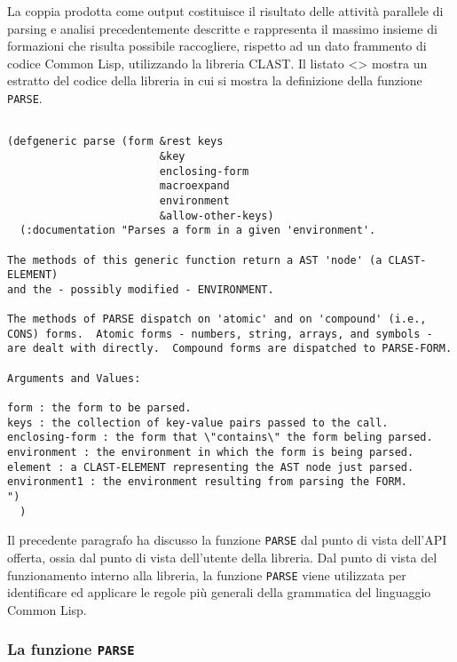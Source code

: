 La coppia prodotta come output costituisce il risultato delle attività
parallele di parsing e analisi precedentemente descritte e rappresenta il
massimo insieme di formazioni che risulta possibile raccogliere, rispetto ad
un dato frammento di codice Common Lisp, utilizzando la libreria CLAST. Il
listato <> mostra un estratto del codice della libreria in cui si mostra la
definizione della funzione \texttt{PARSE}.\\

\begin{lstlisting}[caption=Definizione e documentazione relative alla funzione
\texttt{PARSE}]

(defgeneric parse (form &rest keys
                        &key
                        enclosing-form
                        macroexpand
                        environment
                        &allow-other-keys)
  (:documentation "Parses a form in a given 'environment'.

The methods of this generic function return a AST 'node' (a CLAST-ELEMENT)
and the - possibly modified - ENVIRONMENT.

The methods of PARSE dispatch on 'atomic' and on 'compound' (i.e.,
CONS) forms.  Atomic forms - numbers, string, arrays, and symbols -
are dealt with directly.  Compound forms are dispatched to PARSE-FORM.

Arguments and Values:

form : the form to be parsed.
keys : the collection of key-value pairs passed to the call.
enclosing-form : the form that \"contains\" the form beling parsed.
environment : the environment in which the form is being parsed.
element : a CLAST-ELEMENT representing the AST node just parsed.
environment1 : the environment resulting from parsing the FORM.
")
  )

\end{lstlisting}

Il precedente paragrafo ha discusso la funzione \texttt{PARSE} dal punto di
vista dell'API offerta, ossia dal punto di vista dell'utente della libreria.
Dal punto di vista del funzionamento interno alla libreria, la funzione
\texttt{PARSE} viene utilizzata per identificare ed applicare le regole più
generali della grammatica del linguaggio Common Lisp.\\

\subsubsection{La funzione \texttt{PARSE}}

